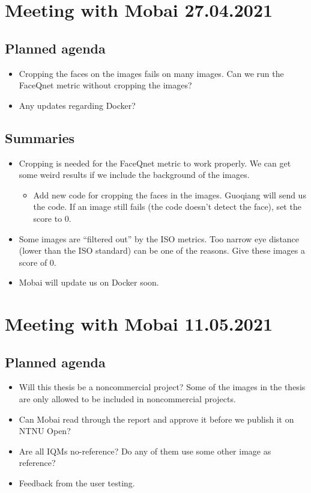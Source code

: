 \newpage

\section*{Meeting with Mobai 27.04.2021}
\subsection*{Planned agenda}
\begin{itemize}
    \item Cropping the faces on the images fails on many images. Can we run the FaceQnet metric without cropping the images?
    \item Any updates regarding Docker?
\end{itemize}

\subsection*{Summaries}
\begin{itemize}
    \item Cropping is needed for the FaceQnet metric to work properly. We can get some weird results if we include the background of the images.
    \begin{itemize}
    \item Add new code for cropping the faces in the images. Guoqiang will send us the code. If an image still fails (the code doesn’t detect the face), set the score to 0.
    \end{itemize}
    \item Some images are “filtered out” by the ISO metrics. Too narrow eye distance (lower than the ISO standard) can be one of the reasons. Give these images a score of 0.
    \item Mobai will update us on Docker soon.
\end{itemize}

\newpage

\section*{Meeting with Mobai 11.05.2021}
\subsection*{Planned agenda}
\begin{itemize}
    \item Will this thesis be a noncommercial project? Some of the images in the thesis are only allowed to be included in noncommercial projects.
    \item Can Mobai read through the report and approve it before we publish it on NTNU Open?
    \item Are all IQMs no-reference? Do any of them use some other image as reference?
    \item Feedback from the user testing.
\end{itemize}

